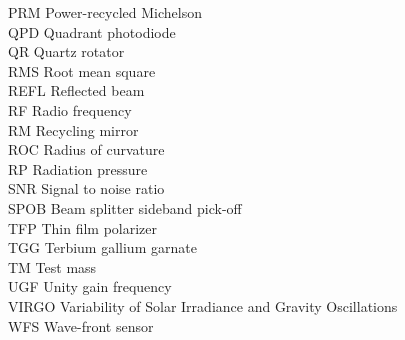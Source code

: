 \begin{tabbing}
PRM \> Power-recycled Michelson \\
QPD \> Quadrant photodiode \\
QR \> Quartz rotator \\
RMS \> Root mean square \\
REFL \> Reflected beam \\
RF \> Radio frequency \\
RM \> Recycling mirror \\
ROC \> Radius of curvature \\
RP \> Radiation pressure \\
SNR \> Signal to noise ratio \\
SPOB \> Beam splitter sideband pick-off \\
TFP \> Thin film polarizer \\
TGG \> Terbium gallium garnate \\
TM \> Test mass \\
UGF \> Unity gain frequency \\
VIRGO \> Variability of Solar Irradiance and Gravity Oscillations \\
WFS \> Wave-front sensor 
\end{tabbing}
